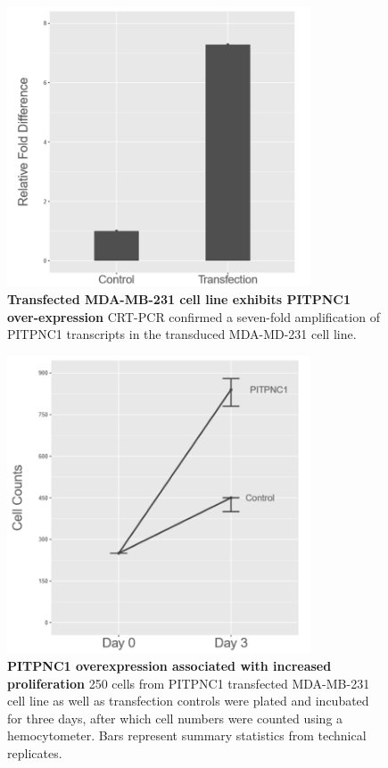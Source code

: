 \documentclass[10pt,letterpaper]{article}
\begin{document}
\begin{figure}[H]
\includegraphics[width = 9cm]{fig3}
\centering
\vspace*{1\baselineskip}
\caption{{\bf Transfected MDA-MB-231 cell line exhibits PITPNC1 over-expression }
CRT-PCR confirmed a seven-fold amplification of PITPNC1 transcripts in the transduced MDA-MD-231 cell line.
}
\label{fig3}
\end{figure}
\vspace*{1\baselineskip}
\begin{figure}[H]
\includegraphics[width = 9cm]{fig4}
\centering
\vspace*{1\baselineskip}
\caption{{\bf PITPNC1 overexpression associated with increased proliferation}
250 cells from PITPNC1 transfected MDA-MB-231 cell line as well as transfection controls were plated and incubated for three days, after which cell numbers were counted using a hemocytometer. Bars represent summary statistics from technical replicates.
}
\label{fig4}
\end{figure}
\end{document}

